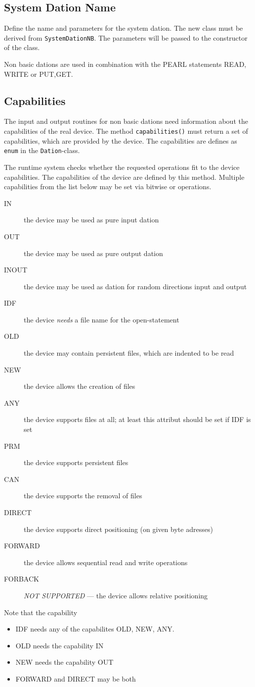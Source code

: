 \subsection{System Dation Name}
Define the name and parameters for the system dation.
The new class must be derived from \verb|SystemDationNB|.
The parameters will be passed to the constructor of the class.

Non basic dations are used in combination with the PEARL statements READ, WRITE
or PUT,GET. 

\subsection{Capabilities}
The input and output routines for non basic dations 
need information about the capabilities of the
real device. The method \verb|capabilities()| must return a set of
capabilities, which are provided by the device. The capabilities are
defines as \verb|enum| in the \verb|Dation|-class.

The runtime system checks whether the requested operations fit to the 
device capabilities. The capabilities of the device are defined by this
method. Multiple capabilities from the list below may be set via bitwise
or operations.

\begin{description}
\item[IN] the device may be used as pure input dation
\item[OUT] the device may be used as pure output dation
\item[INOUT] the device may be used as dation for random directions
    input and output
\item[IDF] the device {\em needs} a file name for the open-statement
\item[OLD] the device may contain persistent files,
          which are indented to be read
\item[NEW] the device allows the creation of files 
\item[ANY] the device  supports files at all; at least 
            this attribut should be set if IDF is set
\item[PRM] the device supports persistent files
\item[CAN] the device supports the removal of files
\item[DIRECT] the device supports direct positioning (on given byte adresses)
\item[FORWARD] the device allows sequential read and write operations
\item[FORBACK] {\em NOT SUPPORTED} --- the device allows relative positioning
\end{description}
Note that the capability
\begin{itemize}
\item IDF needs any of the capabilites OLD, NEW, ANY.
\item OLD needs the capability IN
\item NEW needs the capability OUT
\item FORWARD and DIRECT may be both
\end{itemize}

